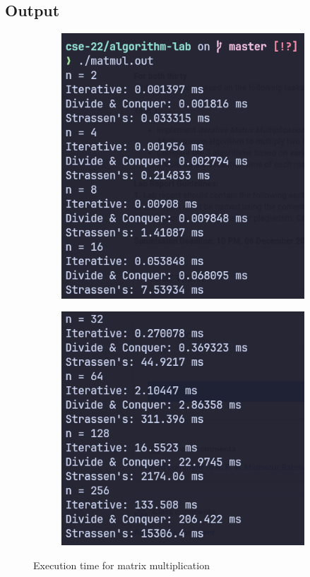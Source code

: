 \subsection{Output}
\begin{figure}[H]
    \centering
    \begin{subfigure}[b]{0.4\textwidth}
        \centering
        \includegraphics[width=\textwidth]{./img/lab3/matmul-1.png}
    \end{subfigure}
    \hfill
    \begin{subfigure}[b]{0.4\textwidth}
        \centering
        \includegraphics[width=\textwidth]{./img/lab3/matmul-2.png}
    \end{subfigure}
    \caption{Execution time for matrix multiplication}
    \label{fig:task1}
\end{figure}

